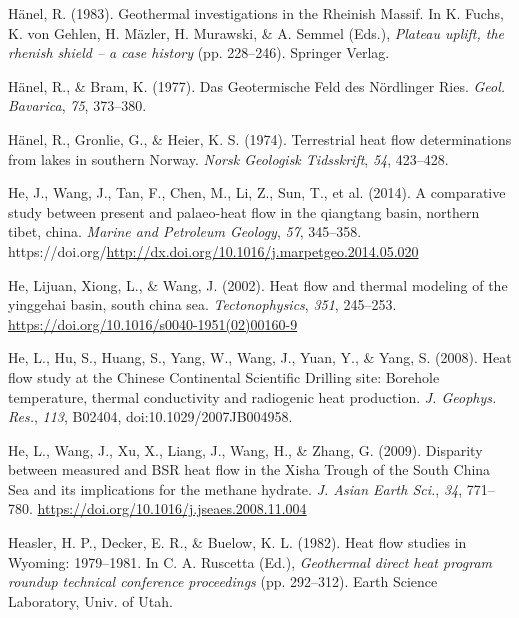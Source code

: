 \documentclass[draft,linenumbers]{agujournal2018}
\begin{document}
\leavevmode{}%
Hänel, R. (1983). Geothermal investigations in the {Rheinish Massif}. In
K. Fuchs, K. von Gehlen, H. Mäzler, H. Murawski, \& A. Semmel (Eds.),
\emph{Plateau uplift, the rhenish shield -- a case history} (pp.
228--246). Springer Verlag.

\leavevmode{}%
Hänel, R., \& Bram, K. (1977). Das {Geotermische Feld des N{ö}rdlinger
Ries}. \emph{Geol. Bavarica}, \emph{75}, 373--380.

\leavevmode{}%
Hänel, R., Gronlie, G., \& Heier, K. S. (1974). Terrestrial heat flow
determinations from lakes in southern {Norway}. \emph{Norsk Geologisk
Tidsskrift}, \emph{54}, 423--428.

\leavevmode{}%
He, J., Wang, J., Tan, F., Chen, M., Li, Z., Sun, T., et al. (2014). A
comparative study between present and palaeo-heat flow in the qiangtang
basin, northern tibet, china. \emph{Marine and Petroleum Geology},
\emph{57}, 345--358.
https://doi.org/\url{http://dx.doi.org/10.1016/j.marpetgeo.2014.05.020}

\leavevmode{}%
He, Lijuan, Xiong, L., \& Wang, J. (2002). Heat flow and thermal
modeling of the yinggehai basin, south china sea. \emph{Tectonophysics},
\emph{351}, 245--253.
\url{https://doi.org/10.1016/s0040-1951(02)00160-9}

\leavevmode{}%
He, L., Hu, S., Huang, S., Yang, W., Wang, J., Yuan, Y., \& Yang, S.
(2008). Heat flow study at the {Chinese Continental Scientific Drilling}
site: Borehole temperature, thermal conductivity and radiogenic heat
production. \emph{J. Geophys. Res.}, \emph{113}, B02404,
doi:10.1029/2007JB004958.

\leavevmode{}%
He, L., Wang, J., Xu, X., Liang, J., Wang, H., \& Zhang, G. (2009).
Disparity between measured and {BSR heat flow in the Xisha Trough of the
South China Sea} and its implications for the methane hydrate. \emph{J.
Asian Earth Sci.}, \emph{34}, 771--780.
\url{https://doi.org/10.1016/j.jseaes.2008.11.004}

\leavevmode{}%
Heasler, H. P., Decker, E. R., \& Buelow, K. L. (1982). Heat flow
studies in {Wyoming}: 1979--1981. In C. A. Ruscetta (Ed.),
\emph{Geothermal direct heat program roundup technical conference
proceedings} (pp. 292--312). Earth Science Laboratory, Univ. of Utah.
\end{document}
